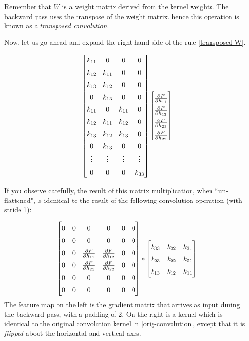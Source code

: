 \documentclass{article}[a4paper]
\begin{document}
Remember that $W$ is a weight matrix derived from the kernel weights. The backward pass uses the transpose of the weight matrix, hence this operation is known as a \textit{transposed convolution}.

Now, let us go ahead and expand the right-hand side of the rule \eqref{transposed-W}.

\small
\begin{equation*}
	\begin{bmatrix}
		k_{11} & 0 & 0 & 0 \\
		k_{12} & k_{11} & 0 & 0 \\
		k_{13} & k_{12} & 0 & 0 \\
		0 & k_{13} & 0 & 0 \\
		k_{11} & 0 & k_{11} & 0 \\
		k_{12} & k_{11} & k_{12} & 0 \\
		k_{13} & k_{12} & k_{13} & 0 \\
		0 & k_{13} & 0 & 0 \\
		\vdots & \vdots & \vdots & \vdots \\
		0 & 0 & 0 & k_{33}
	\end{bmatrix}
	\renewcommand{\arraystretch}{1.5}
	\begin{bmatrix}
		\frac{\partial F}{\partial h_{11}} \\
		\frac{\partial F}{\partial h_{12}} \\
		\frac{\partial F}{\partial h_{21}} \\
		\frac{\partial F}{\partial h_{22}}
	\end{bmatrix}
\end{equation*} \normalsize

If you observe carefully, the result of this matrix multiplication, when ``un-flattened", is identical to the result of the following convolution operation (with stride 1):

\begin{equation}
	\label{flipped-kernel}
	\renewcommand{\arraystretch}{1.5}
	\begin{bmatrix}
		0 & 0 & 0 & 0 & 0 & 0 \\
		0 & 0 & 0 & 0 & 0 & 0 \\
		0 & 0 & \frac{\partial F}{\partial h_{11}} & \frac{\partial F}{\partial h_{12}} & 0 & 0 \\
		0 & 0 & \frac{\partial F}{\partial h_{21}} & \frac{\partial F}{\partial h_{22}} & 0 & 0 \\
		0 & 0 & 0 & 0 & 0 & 0 \\
		0 & 0 & 0 & 0 & 0 & 0
	\end{bmatrix} *
	\begin{bmatrix}
		k_{33} & k_{32} & k_{31} \\
		k_{23} & k_{22} & k_{21} \\
		k_{13} & k_{12} & k_{11}
	\end{bmatrix}
\end{equation}
The feature map on the left is the gradient matrix that arrives as input during the backward pass, with a padding of 2. On the right is a kernel which is identical to the original convolution kernel in \eqref{orig-convolution}, except that it is \textit{flipped} about the horizontal and vertical axes.
\end{document}
